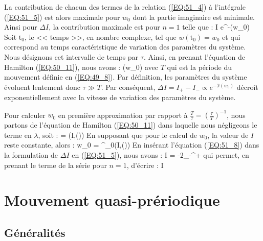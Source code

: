 La contribution de chacun des termes de la relation (\ref{EQ:51_4}) \`{a} l'int\'{e}grale (\ref{EQ:51_5}) est alors maximale pour $w_{0}$ dont la partie imaginaire est minimale. Ainsi pour $\Delta I$, la contribution maximale est pour $n = 1$ telle que :
\be
	\Delta I \propto e^{-\Im(w_{0})} \label{EQ:51_6}
\ee
Soit $\mathrm{t}_{0}$, le << temps >>, en nombre complexe, tel que $w(\mathrm{t}_{0}) = w_{0}$ et qui correspond au temps caract\'{e}ristique de variation des param\`{e}tres du syst\`{e}me. Nous d\'{e}signons cet intervalle de temps par $\tau$. Ainsi, en prenant l'\'{e}quation de Hamilton (\ref{EQ:50_11}), nous avons :
\be
	\Im(w_{0}) \approx \omega\tau \approx {} \label{EQ:51_7}
\ee
avec $T$ qui est la p\'{e}riode du mouvement d\'{e}finie en (\ref{EQ:49_8}). Par d\'{e}finition, les param\`{e}tres du syst\`{e}me \'{e}voluent lentement donc $\tau \gg T$. Par cons\'{e}quent, $\Delta I = I_{+} - I_{-} \propto e^{-\Im(w_{0})}$ d\'{e}cro\^{i}t exponentiellement avec la vitesse de variation des param\`{e}tres du syst\`{e}me.

Pour calculer $w_{0}$ en premi\`{e}re approximation par rapport \`{a} $\frac{T}{\tau} = \left(\frac{\tau}{T}\right)^{-1}$, nous partons de l'\'{e}quation de Hamilton (\ref{EQ:50_11}) dans laquelle nous n\'{e}gligeons le terme en $\dot{\lambda}$, soit :
\be
	 = \omega(I,\lambda()) \label{EQ:51_8}
\ee
En supposant que pour le calcul de $w_{0}$, la valeur de $I$ reste constante, alors :
\be
	w_{0} = \int^{_{0}}{\omega(I,\lambda())} \label{EQ:51_9}
\ee
En ins\'{e}rant l'\'{e}quation (\ref{EQ:51_8}) dans la formulation de $\Delta I$ en (\ref{EQ:51_5}), nous avons :
\benn
	\Delta I = -2\int_{-\infty}^{+\infty}{\Re\left[\sum_{n=1}^{+\infty}ine^{inw}\right]\dot{\lambda}}
\eenn
qui permet, en prenant le terme de la s\'{e}rie pour $n = 1$, d'\'{e}crire :
\be
	\Delta I \propto \Re{} \label{EQ:51_10}
\ee

\section{Mouvement quasi-pr\'{e}riodique}\label{PAR:52}

\subsection{G\'{e}n\'{e}ralit\'{e}s}\label{PAR:52_1}

